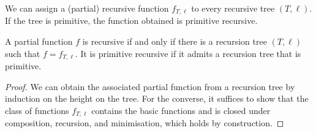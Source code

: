 We can assign a (partial) recursive function \( f_{T,\ell} \) to every recursive tree \( (T, \ell) \).
If the tree is primitive, the function obtained is primitive recursive.
\begin{theorem}
	A partial function \( f \) is recursive if and only if there is a recursion tree \( (T, \ell) \) such that \( f = f_{T, \ell} \).
	It is primitive recursive if it admits a recursion tree that is primitive.
\end{theorem}
\begin{proof}
	We can obtain the associated partial function from a recursion tree by induction on the height on the tree.
	For the converse, it suffices to show that the class of functions \( f_{T,\ell} \) contains the basic functions and is closed under composition, recursion, and minimisation, which holds by construction.
\end{proof}
